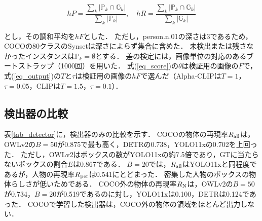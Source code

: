 \begin{equation}
    hP = \frac{\sum_k |{\mathbb P}_k \cap {\mathbb G}_k|}{\sum_k |{\mathbb P}_k|}, \quad hR = \frac{\sum_k |{\mathbb P}_k \cap {\mathbb G}_k|}{\sum_k |{\mathbb G}_k|}
    \label{eq_hier}
\end{equation}

\noindent
とし，その調和平均を$ hF $とした．
ただし，person.n.01の深さは3であるため，COCOの80クラスのSynsetは深さによらず集合に含めた．
未検出または残さなかったインスタンスは$ {\mathbb P}_k = \emptyset $とする．
差の検定には，画像単位の対応のあるブートストラップ（1000回）を用いた．
式(\ref{eq_score})の$ \theta $は検証用の画像の$ F $で，式(\ref{eq_output})の$ T $と$ \tau $は検証用の画像の$ hF $で選んだ（Alpha-CLIPは$ T = 1 $，$ \tau = 0.05 $，CLIPは$ T = 1.5 $，$ \tau = 0.1 $）．

\subsection{検出器の比較}
\begin{table}[t]
\centering
\caption{検出器のみの比較（テスト用の画像）．$ R_{\rm N} $はLVISの注釈がある474枚のCOCO外の物体2687件に対する値，その他はCOCOのGT 3458件に対する値である．記号は表\ref{tab_metrics}による（$ N $：ボックス数，$ R_{\rm all} $：再現率，$ R_{\rm per} $：人物の再現率，$ R_{\rm oth} $：人物以外の再現率，$ E $：GTに当たらない割合，$ R_{\rm N} $：COCO外の物体の再現率，$ t $：時間）．}
\label{tab_detector}
\setlength{\tabcolsep}{2.5pt}
\end{table}

表\ref{tab_detector}に，検出器のみの比較を示す．
COCOの物体の再現率$ R_{\rm all} $は，OWLv2の$ B = 50 $が0.875で最も高く，DETRの0.738，YOLO11xの0.702を上回った．
ただし，OWLv2はボックスの数がYOLO11xの約7.5倍であり，GTに当たらないボックスの割合$ E $は0.867である．
$ B = 20 $では，$ R_{\rm all} $はYOLO11xと同程度であるが，人物の再現率$ R_{\rm per} $は0.541にとどまった．
密集した人物のボックスの物体らしさが低いためである．
COCO外の物体の再現率$ R_{\rm N} $は，OWLv2の$ B = 50 $が0.734，$ B = 20 $が0.519であるのに対し，YOLO11xは0.100，DETRは0.124であった．
COCOで学習した検出器は，COCO外の物体の領域をほとんど出力しない．

